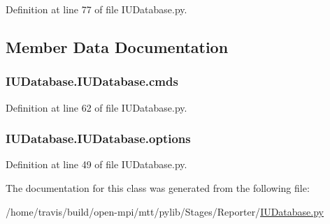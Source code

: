 Definition at line 77 of file I\-U\-Database.\-py.



\subsection{Member Data Documentation}
\hypertarget{class_i_u_database_1_1_i_u_database_a65d3fd103b54ba61830a606bd2258094}{
\subsubsection[{cmds}]{\setlength{\rightskip}{0pt plus 5cm}I\-U\-Database.\-I\-U\-Database.\-cmds}}\label{class_i_u_database_1_1_i_u_database_a65d3fd103b54ba61830a606bd2258094}


Definition at line 62 of file I\-U\-Database.\-py.

\hypertarget{class_i_u_database_1_1_i_u_database_a87c602469e1908c2c79859691839e9de}{
\subsubsection[{options}]{\setlength{\rightskip}{0pt plus 5cm}I\-U\-Database.\-I\-U\-Database.\-options}}\label{class_i_u_database_1_1_i_u_database_a87c602469e1908c2c79859691839e9de}


Definition at line 49 of file I\-U\-Database.\-py.



The documentation for this class was generated from the following file\-:\begin{DoxyCompactItemize}
\item 
/home/travis/build/open-\/mpi/mtt/pylib/\-Stages/\-Reporter/\hyperlink{_i_u_database_8py}{I\-U\-Database.\-py}\end{DoxyCompactItemize}

